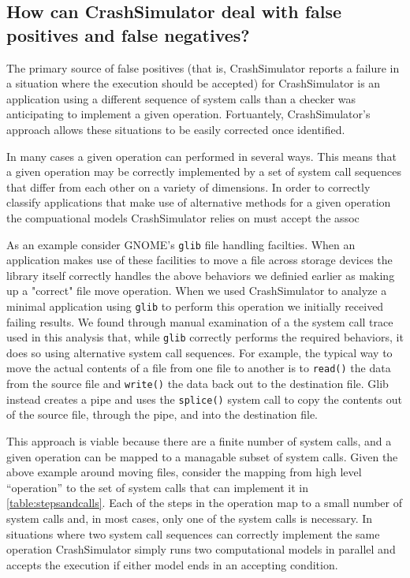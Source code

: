 \subsection{How can CrashSimulator deal with false positives and false negatives?}

The primary source of false positives (that is, CrashSimulator reports a failure
in a situation where the execution should be accepted) for CrashSimulator is an
application using a different sequence of system calls than a checker was
anticipating to implement a given operation.  Fortuantely, CrashSimulator's
approach allows these situations to be easily corrected once identified.

In many cases a given operation can performed in several ways.  This means that
a given operation may be correctly implemented by a set of system call sequences
that differ from each other on a variety of dimensions.  In order to correctly
classify applications that make use of alternative methods for a given operation
the compuational models CrashSimulator relies on must accept the assoc

As an example consider GNOME's {\tt glib} file handling facilties.  When an
application makes use of these facilities to move a file across storage devices
the library itself correctly handles the above behaviors we definied earlier as
making up a "correct" file move operation.  When we used CrashSimulator to
analyze a minimal application using {\tt glib} to perform this operation we
initially received failing results.  We found through manual examination of a
the system call trace used in this analysis that, while {\tt glib} correctly performs
the required behaviors, it does so using alternative system call sequences.  For
example, the typical way to move the actual contents of a file from one file to
another is to {\tt read()} the data from the source file and {\tt write()} the
data back out to the destination file.  Glib instead creates a pipe and uses the
{\tt splice()} system call to copy the contents out of the source file, through
the pipe, and into the destination file.

This approach is viable because there are a finite number of system calls, and a
given operation can be mapped to a managable subset of system calls.  Given the
above example around moving files, consider the mapping from high level
``operation'' to the set of system calls that can implement it in
\ref{table:stepsandcalls}.  Each of the steps in the operation map to a small
number of system calls and, in most cases, only one of the system calls is
necessary.  In situations where two system call sequences can correctly
implement the same operation CrashSimulator simply runs two computational models
in parallel and accepts the execution if either model ends in an accepting
condition.

